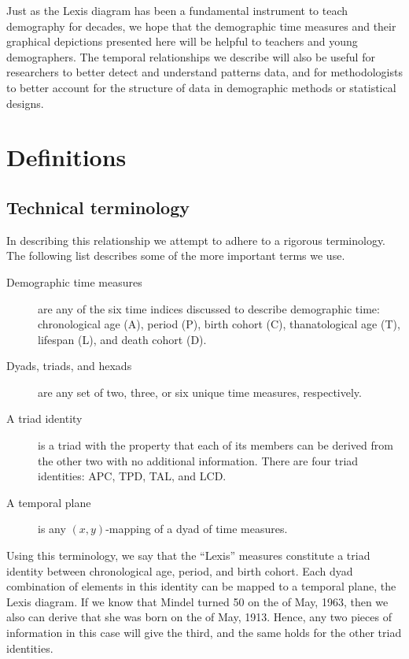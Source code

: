 \documentclass[12pt,oneside,a4paper]{article} %
\theoremstyle{definition}
\begin{document}
Just as the Lexis diagram has been a fundamental instrument to
teach demography for decades, we hope that the demographic time measures and
their graphical depictions presented here will be helpful to teachers and
young demographers. The temporal relationships we describe will also be useful
for researchers to better detect and understand patterns data, and for
methodologists to better account for the structure of data in demographic
methods or statistical designs.

\section{Definitions}
\subsection{Technical terminology}
In describing this relationship we attempt to adhere to a rigorous
terminology.
The following list describes some of the more important terms we use.
\begin{description}
\item[Demographic time measures] are any of the six time indices discussed to
describe demographic time: chronological age (A), period (P), birth cohort (C), thanatological age (T), lifespan (L), and death cohort (D).
\item[Dyads, triads, and hexads] are any set of two, three, or six unique time
measures, respectively.
\item[A triad identity] is a triad with the property that each of its members
can be derived from the other two with no additional information. There are four triad
identities: APC, TPD, TAL, and LCD.
\item[A temporal plane] is any $(x,y)$-mapping of a dyad of time measures.
\end{description}
Using this terminology, we say that the ``Lexis'' measures
constitute a triad identity between chronological age, period, and birth cohort. Each dyad
combination of elements in this identity can be mapped to a
temporal plane, the Lexis diagram. If we know that Mindel turned 50 on the
 of May, 1963, then we also can derive that she was born on the  of
May, 1913. Hence, any two pieces of information in this case will give the
third, and the same holds for the other triad identities.
\end{document}
